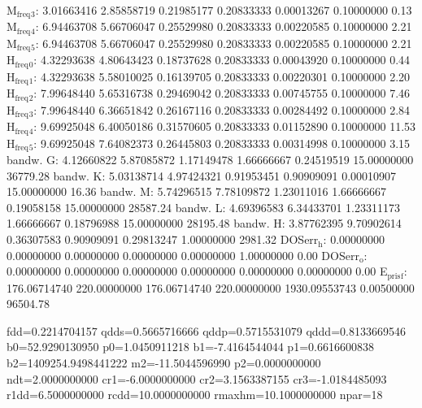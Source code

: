 \documentclass[11pt]{article}
\begin{document}
M\(_{\text{freq}}\)\(_{\text{3}}\):   3.01663416   2.85858719   0.21985177   0.20833333   0.00013267   0.10000000         0.13
M\(_{\text{freq}}\)\(_{\text{4}}\):   6.94463708   5.66706047   0.25529980   0.20833333   0.00220585   0.10000000         2.21
M\(_{\text{freq}}\)\(_{\text{5}}\):   6.94463708   5.66706047   0.25529980   0.20833333   0.00220585   0.10000000         2.21
H\(_{\text{freq}}\)\(_{\text{0}}\):   4.32293638   4.80643423   0.18737628   0.20833333   0.00043920   0.10000000         0.44
H\(_{\text{freq}}\)\(_{\text{1}}\):   4.32293638   5.58010025   0.16139705   0.20833333   0.00220301   0.10000000         2.20
H\(_{\text{freq}}\)\(_{\text{2}}\):   7.99648440   5.65316738   0.29469042   0.20833333   0.00745755   0.10000000         7.46
H\(_{\text{freq}}\)\(_{\text{3}}\):   7.99648440   6.36651842   0.26167116   0.20833333   0.00284492   0.10000000         2.84
H\(_{\text{freq}}\)\(_{\text{4}}\):   9.69925048   6.40050186   0.31570605   0.20833333   0.01152890   0.10000000        11.53
H\(_{\text{freq}}\)\(_{\text{5}}\):   9.69925048   7.64082373   0.26445803   0.20833333   0.00314998   0.10000000         3.15
bandw. G:   4.12660822   5.87085872   1.17149478   1.66666667   0.24519519  15.00000000     36779.28
bandw. K:   5.03138714   4.97424321   0.91953451   0.90909091   0.00010907  15.00000000        16.36
bandw. M:   5.74296515   7.78109872   1.23011016   1.66666667   0.19058158  15.00000000     28587.24
bandw. L:   4.69396583   6.34433701   1.23311173   1.66666667   0.18796988  15.00000000     28195.48
bandw. H:   3.87762395   9.70902614   0.36307583   0.90909091   0.29813247   1.00000000      2981.32
DOSerr\(_{\text{h}}\):   0.00000000   0.00000000   0.00000000   0.00000000   0.00000000   1.00000000         0.00
DOSerr\(_{\text{o}}\):   0.00000000   0.00000000   0.00000000   0.00000000   0.00000000   0.00000000         0.00
E\(_{\text{pris}}\)\(_{\text{f}}\): 176.06714740 220.00000000 176.06714740 220.00000000 1930.09553743   0.00500000     96504.78  


fdd=0.2214704157 qdds=0.5665716666 qddp=0.5715531079 qddd=0.8133669546 b0=52.9290130950 p0=1.0450911218 b1=-7.4164544044 p1=0.6616600838 b2=1409254.9498441222 m2=-11.5044596990 p2=0.0000000000 ndt=2.0000000000 cr1=-6.0000000000 cr2=3.1563387155 cr3=-1.0184485093 r1dd=6.5000000000 rcdd=10.0000000000 rmaxhm=10.1000000000 npar=18 
\end{document}
